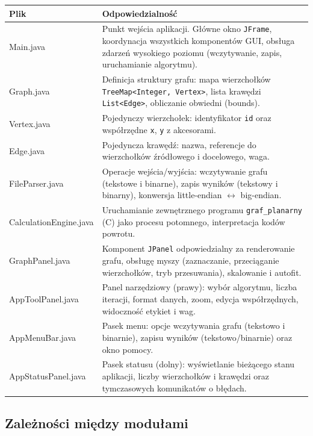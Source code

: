 \documentclass[a4paper, 11pt]{article}
\begin{document}
\begin{center}
\begin{tabular}{>{\ttfamily}l p{9.2cm}}
\toprule
\normalfont\textbf{Plik} & \textbf{Odpowiedzialno\'s\'c} \\
\midrule
Main.java            & Punkt wejścia aplikacji. Główne okno \texttt{JFrame}, koordynacja wszystkich komponentów GUI, obsługa zdarzeń wysokiego poziomu (wczytywanie, zapis, uruchamianie algorytmu). \\
\addlinespace
Graph.java           & Definicja struktury grafu: mapa wierzchołków \texttt{TreeMap<Integer, Vertex>}, lista krawędzi \texttt{List<Edge>}, obliczanie obwiedni (bounds). \\
\addlinespace
Vertex.java          & Pojedynczy wierzchołek: identyfikator \texttt{id} oraz współrzędne \texttt{x}, \texttt{y} z akcesorami. \\
\addlinespace
Edge.java            & Pojedyncza krawędź: nazwa, referencje do wierzchołków źródłowego i docelowego, waga. \\
\addlinespace
FileParser.java      & Operacje wejścia/wyjścia: wczytywanie grafu (tekstowe i binarne), zapis wyników (tekstowy i binarny), konwersja little-endian $\leftrightarrow$ big-endian. \\
\addlinespace
CalculationEngine.java & Uruchamianie zewnętrznego programu \texttt{graf\_planarny} (C) jako procesu potomnego, interpretacja kodów powrotu. \\
\addlinespace
GraphPanel.java      & Komponent \texttt{JPanel} odpowiedzialny za renderowanie grafu, obsługę myszy (zaznaczanie, przeciąganie wierzchołków, tryb przesuwania), skalowanie i autofit. \\
\addlinespace
AppToolPanel.java    & Panel narzędziowy (prawy): wybór algorytmu, liczba iteracji, format danych, zoom, edycja współrzędnych, widoczność etykiet i wag. \\
\addlinespace
AppMenuBar.java      & Pasek menu: opcje wczytywania grafu (tekstowo i binarnie), zapisu wyników (tekstowo/binarnie) oraz okno pomocy. \\
\addlinespace
AppStatusPanel.java  & Pasek statusu (dolny): wyświetlanie bieżącego stanu aplikacji, liczby wierzchołków i krawędzi oraz tymczasowych komunikatów o błędach. \\
\bottomrule
\end{tabular}
\end{center}

\subsection{Zależności między modułami}
\end{document}

